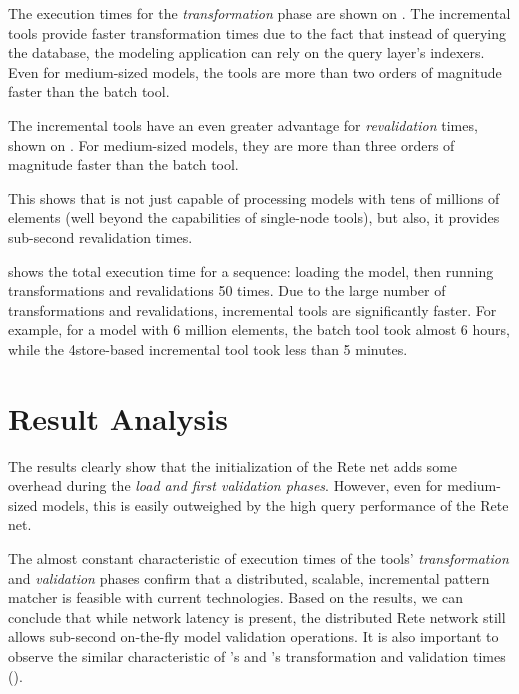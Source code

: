 
The execution times for the \emph{transformation} phase are shown on . The incremental tools provide faster transformation times due to the fact that instead of querying the database, the modeling application can rely on the query layer's indexers. Even for medium-sized models, the \iqd{} tools are more than two orders of magnitude faster than the batch tool.


The incremental tools have an even greater advantage for \emph{revalidation} times, shown on . For medium-sized models, they are more than three orders of magnitude faster than the batch tool.

This shows that \iqd{} is not just capable of processing models with tens of millions of elements (well beyond the capabilities of single-node tools), but also, it provides sub-second revalidation times.


 shows the total execution time for a sequence: loading the model, then running transformations and revalidations 50 times. Due to the large number of transformations and revalidations, incremental tools are significantly faster. For example, for a model with 6 million elements, the batch tool took almost 6 hours, while the 4store-based incremental tool took less than 5 minutes. 

\section{Result Analysis}

The results clearly show that the initialization of the Rete net adds some overhead during the \emph{load and first validation phases}. However, even for medium-sized models, this is easily outweighed by the high query performance of the Rete net.

The almost constant characteristic of execution times of the \iqd{} tools' \emph{transformation} and \emph{validation} phases confirm that a distributed, scalable, incremental pattern matcher is feasible with current technologies. Based on the results, we can conclude that while network latency is present, the distributed Rete network still allows sub-second on-the-fly model validation operations. It is also important to observe the similar characteristic of \iqd{}'s and \eiq{}'s transformation and validation times ().

